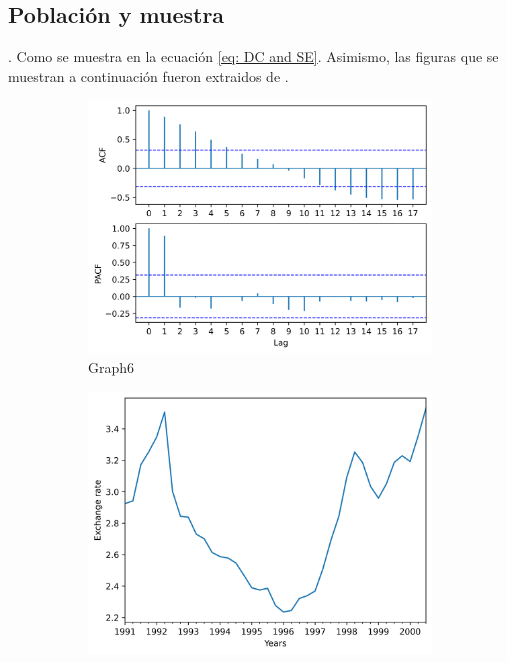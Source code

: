 \documentclass[12pt,a4paper]{article} %
\begin{document}
		\subsection{Población y muestra}
			\lipsum[1]. Como se muestra en la ecuación \textcolor{blue}{\eqref{eq: DC and SE}}. Asimismo, las figuras que se muestran a continuación fueron extraidos de \textcolor{blue}{\cite{Huang-2022}}.
			\begin{figure}[ht]
				\centering
				\begin{subfigure}[b]{0.3\textwidth}
					\centering
					\includegraphics[width=\textwidth]{Graph6.png}
					\caption{Graph6}
					\label{subfig: Graph6}
				\end{subfigure}
				\hfill
				\begin{subfigure}[b]{0.3\textwidth}
					\centering
					\includegraphics[width=\textwidth]{Graph4.png}

\end{subfigure}
\end{figure}
\end{document}
